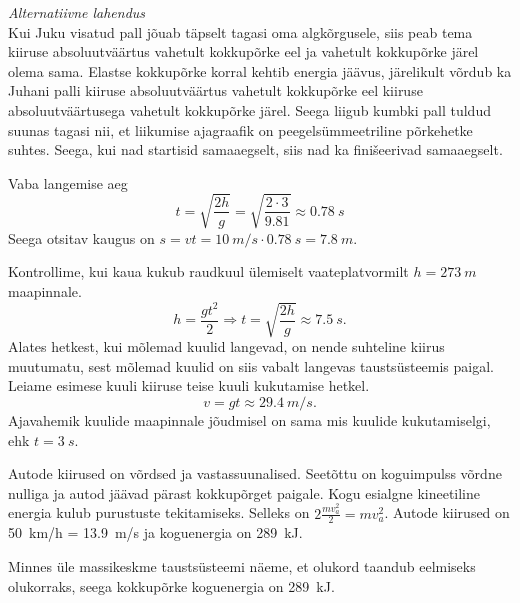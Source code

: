 \documentclass[10pt]{article}
\begin{document}
{\vspace{0.5\baselineskip}

\emph{Alternatiivne lahendus}\\
Kui Juku visatud pall jõuab täpselt tagasi oma algkõrgusele, siis peab tema kiiruse absoluutväärtus vahetult kokkupõrke eel ja vahetult kokkupõrke järel olema sama. Elastse kokkupõrke korral kehtib energia jäävus, järelikult võrdub ka Juhani palli kiiruse absoluutväärtus vahetult kokkupõrke eel kiiruse absoluutväärtusega vahetult kokkupõrke järel. Seega liigub kumbki pall tuldud suunas tagasi nii, et liikumise ajagraafik on peegelsümmeetriline põrkehetke suhtes. Seega, kui nad startisid samaaegselt, siis nad ka finišeerivad samaaegselt.
\probend
\bigskip


\solu
Vaba langemise aeg
\[
t=\sqrt{\frac{2 h}{g}}=\sqrt{\frac{2 \cdot 3}{\num{9,81}}} \approx \SI{0,78}{s}
\]
Seega otsitav kaugus on $s = vt = \SI{10}{m/s} \cdot \SI{0,78}{s} = \SI{7,8}{m}$.
\probend
\bigskip


\solu
Kontrollime, kui kaua kukub raudkuul ülemiselt vaateplatvormilt $h=\SI{273}{m}$ maapinnale.
\[h=\frac{gt^2}{2} \Rightarrow t=\sqrt{\frac{2h}{g}}\approx \SI{7.5}{s}.\]
Alates hetkest, kui mõlemad kuulid langevad, on nende suhteline kiirus muutumatu, sest mõlemad kuulid on siis vabalt langevas taustsüsteemis paigal.
Leiame esimese kuuli kiiruse teise kuuli kukutamise hetkel.
\[v=gt\approx \SI{29.4}{m/s}.\]
Ajavahemik kuulide maapinnale jõudmisel on sama mis kuulide kukutamiselgi, ehk $t=\SI{3}{s}$.
\probend
\bigskip


\solu
\osa Autode kiirused on võrdsed ja vastassuunalised. Seetõttu on koguimpulss võrdne nulliga ja autod jäävad pärast kokkupõrget paigale. Kogu esialgne kineetiline energia kulub purustuste tekitamiseks. Selleks on $2 \frac{m v_{a}^{2}}{2}=m v_{a}^{2}$. Autode kiirused on \SI{50}{km/h} = \SI{13,9}{m/s} ja koguenergia on \SI{289}{kJ}.

\osa Minnes üle massikeskme taustsüsteemi näeme, et olukord taandub eelmiseks olukorraks, seega kokkupõrke koguenergia on \SI{289}{kJ}.
\probend
\bigskip

}
\end{document}

